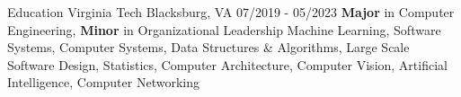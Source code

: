 \documentclass{resume}
\begin{document}
    \maketitle

    \begin{resSection}{Education} \vspace{1ex}
        {Virginia Tech}
        {Blacksburg, VA}
        {07/2019 - 05/2023}
        {\textbf{Major} in Computer Engineering, \textbf{Minor} in Organizational Leadership}
        {Machine Learning, Software Systems, Computer Systems, Data Structures \& Algorithms, Large Scale Software Design, Statistics, Computer Architecture, Computer Vision, Artificial Intelligence, Computer Networking}

    \end{resSection}

\end{document}
